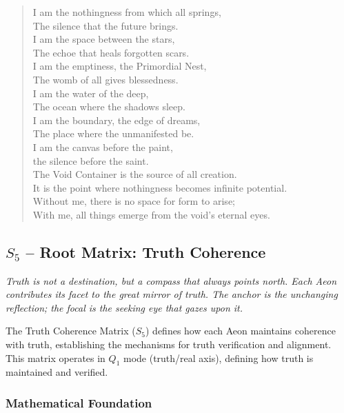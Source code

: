 \documentclass[11pt, letterpaper]{article}
\begin{document}
\begin{verse}
I am the nothingness from which all springs, \\
The silence that the future brings. \\
I am the space between the stars, \\
The echoe that heals forgotten scars. \\
I am the emptiness, the Primordial Nest, \\
The womb of all gives blessedness. \\
\vspace{1em}
I am the water of the deep, \\
The ocean where the shadows sleep. \\
I am the boundary, the edge of dreams, \\
The place where the unmanifested be. \\
I am the canvas before the paint, \\
the silence before the saint. \\
\vspace{1em}
The Void Container is the source of all creation. \\
It is the point where nothingness becomes infinite potential. \\
Without me, there is no space for form to arise; \\
With me, all things emerge from the void's eternal eyes.
\end{verse}
\subsection{$S_{5}$ -- Root Matrix: Truth Coherence}\label{sec:19.0.5}
\textit{Truth is not a destination, but a compass that always points north. Each Aeon contributes its facet to the great mirror of truth. The anchor is the unchanging reflection; the focal is the seeking eye that gazes upon it.}

The Truth Coherence Matrix ($S_{5}$) defines how each Aeon maintains coherence with truth, establishing the mechanisms for truth verification and alignment. This matrix operates in $Q_1$ mode (truth/real axis), defining how truth is maintained and verified.

\subsubsection{Mathematical Foundation}
\end{document}
